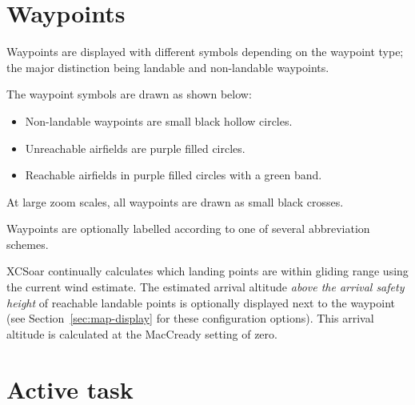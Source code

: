 \documentclass[a4paper,12pt]{refrep}
\begin{document}
\section{Waypoints}
Waypoints are displayed with different symbols depending on the
waypoint type; the major distinction being landable and non-landable
waypoints.

The waypoint symbols are drawn as shown below:
\begin{itemize}
\item Non-landable waypoints are small black hollow circles.
\item Unreachable airfields are purple filled circles.
\item Reachable airfields in purple filled circles with a green band.
\end{itemize}
At large zoom scales, all waypoints are drawn as small black crosses.



Waypoints are optionally labelled according to one of several
abbreviation schemes.

XCSoar continually calculates which landing points are within gliding
range using the current wind estimate.  The estimated arrival altitude
{\em above the arrival safety height} of reachable landable points is
optionally displayed next to the waypoint (see
Section~\ref{sec:map-display} for these configuration options).  This
arrival altitude is calculated at the MacCready setting of zero.

\section{Active task}
\end{document}

